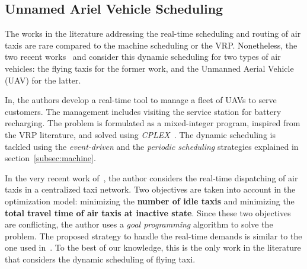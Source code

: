 \subsection{Unnamed Ariel Vehicle Scheduling}

The works in the literature addressing the real-time scheduling and routing of air taxis are rare compared to the machine scheduling or the VRP. Nonetheless, the two recent works~\cite{rajendran2021} and \cite{song2016} consider this dynamic scheduling for two types of air vehicles: the flying taxis for the former work, and the Unmanned Aerial Vehicle (\acs{UAV}) for the latter.

In\cite{song2016}, the authors develop a real-time tool to manage a fleet of \acs{UAV}s to serve customers. The management includes visiting the service station for battery recharging. The problem is formulated as a mixed-integer program, inspired from the \acs{VRP} literature, and solved using \textit{CPLEX}~\cite{cplex2009v12}. The dynamic scheduling is tackled using the \textit{event-driven} and the \textit{periodic scheduling} strategies explained in section~\ref{subsec:machine}.


In the very recent work of~\cite{rajendran2021}, the author considers the real-time dispatching of air taxis in a centralized taxi network. Two objectives are taken into account in the optimization model: minimizing  the \textbf{number of idle taxis} and minimizing the \textbf{total travel time of air taxis at inactive state}. Since these two objectives are conflicting, the author uses a \textit{goal programming} algorithm to solve the problem. The proposed strategy to handle the real-time demands is similar to the one used in~\cite{sun1994}. To the best of our knowledge, this is the only work in the literature that considers the dynamic scheduling of flying taxi.


























